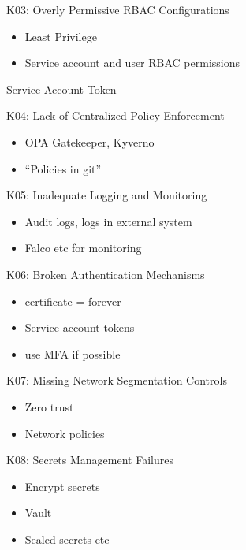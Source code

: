 \documentclass{dcpresentation}
\begin{document}
\begin{frame}{K03: Overly Permissive RBAC Configurations}
 \begin{itemize}
  \item Least Privilege
  \item Service account and user RBAC permissions
 \end{itemize}
\end{frame}

\begin{frame}
 Service Account Token
 
\end{frame}

\begin{frame}{K04: Lack of Centralized Policy Enforcement}
 \begin{itemize}
  \item OPA Gatekeeper, Kyverno
  \item ``Policies in git''
 \end{itemize}
\end{frame}

\begin{frame}{K05: Inadequate Logging and Monitoring}
 \begin{itemize}
  \item Audit logs, logs in external system
  \item Falco etc for monitoring
 \end{itemize}
\end{frame}

\begin{frame}{K06: Broken Authentication Mechanisms}
 \begin{itemize}
  \item certificate = forever
  \item Service account tokens
  \item use MFA if possible
 \end{itemize}
\end{frame}

\begin{frame}{K07: Missing Network Segmentation Controls}
 \begin{itemize}
  \item Zero trust 
  \item Network policies
 \end{itemize}
\end{frame}

\begin{frame}{K08: Secrets Management Failures}
 \begin{itemize}
  \item Encrypt secrets
  \item Vault
  \item Sealed secrets etc
 \end{itemize}
\end{frame}
\end{document}
